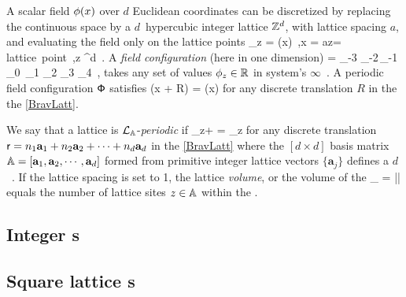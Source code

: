 \documentclass[11pt,a4paper]{article}
\begin{document}
A scalar field $\phi(x)$ over $d$ Euclidean coordinates can be
discretized by
replacing the continuous space by a $d$\dmn\ hypercubic {integer lattice}
$\mathbb{Z}^d$,
%
%
with lattice spacing $a$, and
evaluating the {field} only on the
lattice points
\beq
\ssp_z
=
\ssp(x)
\,,\qquad \qquad x = az= \mbox{lattice point}
\,,\quad z \in \integers^d
\,.
A {\em field configuration} (here in one {\spt} dimension)
\beq
\Xx =
\cdots {\ssp}_{-3} {\ssp}_{-2}\,{\ssp}_{-1}\,
{\ssp}_0\,
{\ssp}_{1} {\ssp}_{2} {\ssp}_{3} {\ssp}_{4}  \cdots
\,,
takes any set of values $\phi_{z}\in\mathbb{R}$ in system's $\infty$\dmn\
\emph{\statesp}.
A {periodic} {field configuration} $\mathsf{\Phi}$ satisfies
\beq
\Xx({x} + {R}) = \Xx({x})
for any discrete translation
$R$ in the the {\Blatt} \eqref{BravLatt}.

We say that a {lattice {\fconf}} is $\mathcal{L}_{\mathbb{A}}$-\emph{periodic} if 
\beq 
\ssp_{z+\shift} = \ssp_z 
for any discrete translation 
$\mathsf{r}=n_{1}\mathbf{a}_1+n_{2}\mathbf{a}_2+\cdots+n_{d}\mathbf{a}_d$ in 
the {\Blatt} \eqref{BravLatt}
where the $[d\!\times\!d]$ basis matrix 
\(
\mathbb{A} = 
\left[
\mathbf{a}_{1}, \mathbf{a}_{2}, \cdots,  \mathbf{a}_{d}
\right]
\) 
formed from primitive integer lattice vectors $\{\mathbf{a}_j\}$ 
defines a $d$\dmn\ \emph{\pcell}\rf{AshMer,CoEvBu22}.
If the lattice 
spacing  is set to 1, the lattice \emph{volume}, or the 
volume of the {\pcell} 
\beq
\vol_ = |\Det{}| 
equals the number of lattice sites $z\in \mathbb{A}$ within the {\pcell}.

\subsection{Integer {\Blatt}s}
\label{s:Blatt1d} 


\subsection{Square lattice {\Blatt}s}
\label{s:BlattSquare} 
\end{document}
